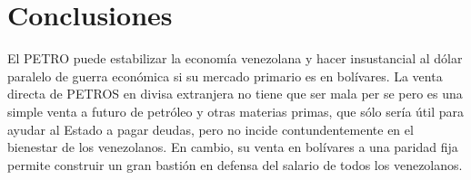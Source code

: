 %
\section{Conclusiones}
\label{sec:conclu}
%
El PETRO puede estabilizar la economía venezolana y hacer insustancial al dólar paralelo de guerra económica si su mercado primario es en bolívares. La venta directa de PETROS en divisa extranjera no tiene que ser mala per se pero es una simple venta a futuro de petróleo y otras materias primas, que sólo sería útil para ayudar al Estado a pagar deudas, pero no incide contundentemente en el bienestar de los venezolanos. En cambio, su venta en bolívares a una paridad fija permite construir un gran bastión en defensa del salario de todos los venezolanos.